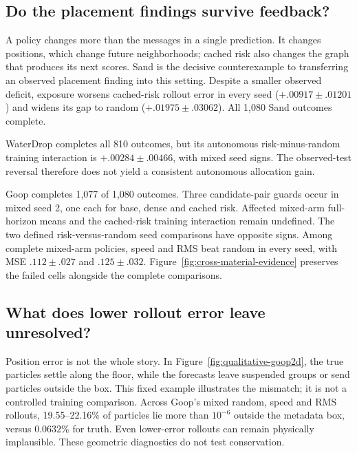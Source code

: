 \subsection{Do the placement findings survive feedback?}
A policy changes more than the messages in a single prediction. It changes positions, which change future neighborhoods; cached risk also changes the graph that produces its next scores. Sand is the decisive counterexample to transferring an observed placement finding into this setting. Despite a smaller observed deficit, exposure worsens cached-risk rollout error in every seed ($+.00917\pm.01201$) and widens its gap to random ($+.01975\pm.03062$). All 1,080 Sand outcomes complete.

WaterDrop completes all 810 outcomes, but its autonomous risk-minus-random training interaction is $+.00284\pm.00466$, with mixed seed signs. The observed-test reversal therefore does not yield a consistent autonomous allocation gain. 

Goop completes 1,077 of 1,080 outcomes. Three candidate-pair guards occur in mixed seed 2, one each for base, dense and cached risk. Affected mixed-arm full-horizon means and the cached-risk training interaction remain undefined. The two defined risk-versus-random seed comparisons have opposite signs. Among complete mixed-arm policies, speed and RMS beat random in every seed, with MSE $.112\pm.027$ and $.125\pm.032$. Figure~\ref{fig:cross-material-evidence} preserves the failed cells alongside the complete comparisons.

\subsection{What does lower rollout error leave unresolved?}
Position error is not the whole story. In Figure~\ref{fig:qualitative-goop2d}, the true particles settle along the floor, while the forecasts leave suspended groups or send particles outside the box. This fixed example illustrates the mismatch; it is not a controlled training comparison. Across Goop's mixed random, speed and RMS rollouts, 19.55--22.16\% of particles lie more than $10^{-6}$ outside the metadata box, versus $0.0632\%$ for truth. Even lower-error rollouts can remain physically implausible. These geometric diagnostics do not test conservation.


